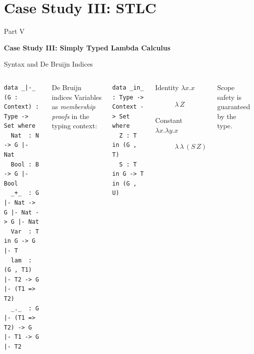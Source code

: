 \documentclass[10pt,compress,aspectratio=169]{beamer}
\begin{document}
\section{Case Study III: STLC}

\begin{frame}{}
  \centering\vfill
  {Part V\par}
  \bigskip
  {\Large\bfseries Case Study III: Simply Typed Lambda Calculus}
  \vfill
\end{frame}

\begin{frame}[fragile]{Syntax and De Bruijn Indices}
  \begin{columns}[T]
      \begin{verbatim}
data _|-_ (G : Context) : Type -> Set where
  Nat  : N -> G |- Nat
  Bool : B -> G |- Bool
  _+_  : G |- Nat -> G |- Nat -> G |- Nat
  Var  : T in G -> G |- T
  lam  : (G , T1) |- T2 -> G |- (T1 => T2)
  _._  : G |- (T1 => T2) -> G |- T1 -> G |- T2
      \end{verbatim}
      \begin{block}{De Bruijn indices}
        Variables as \emph{membership proofs} in the typing context:
      \end{block}
      \begin{verbatim}
data _in_ : Type -> Context -> Set where
  Z : T in (G , T)
  S : T in G -> T in (G , U)
      \end{verbatim}
      \medskip
      \begin{description}
        \item[Identity $\lambda x.x$] $\lambda\, Z$
        \item[Constant $\lambda x.\lambda y.x$] $\lambda\,\lambda\, (S\,Z)$
      \end{description}
      {\footnotesize Scope safety is guaranteed by the type.}
  \end{columns}
\end{frame}
\end{document}
